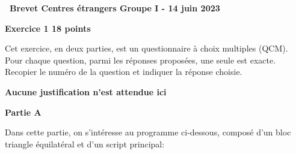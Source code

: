 \documentclass[11pt]{article}
\begin{document}
\begin{center} {\Large \textbf{\decofourleft~Brevet Centres étrangers Groupe I - 14 juin 2023 \decofourright}}
\end{center}

\bigskip

\textbf{Exercice 1 \hfill 18 points}

\medskip

Cet exercice, en deux parties, est un questionnaire à choix multiples (QCM). Pour chaque question, parmi les réponses proposées, une seule est exacte. Recopier le numéro de la question et indiquer la réponse choisie.

\textbf{Aucune justification n'est attendue ici}

\medskip

\textbf{Partie A}

\medskip

Dans cette partie, on s'intéresse au programme ci-dessous, composé d'un bloc \og triangle équilatéral\fg{} et d'un script principal:
\end{document}
